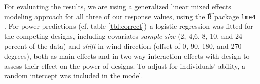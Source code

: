 

For evaluating the results, we are using a generalized linear mixed effects modeling  approach \cite{pinheiro:2000} for all three of our response values, using the {\t R} package {\tt lme4} \cite{bates:2011}. 
For power predictions (cf. table \ref{tbl:correct}) a logistic regression was fitted for the competing designs, including covariates {\it sample size} (2, 4,6, 8, 10, and 24 percent of the data) and {\it shift} in wind direction (offset of 0, 90, 180, and 270 degrees), both as main effects and in two-way interaction effects with design to assess their effect on the power of designs. To adjust for individuals' ability, a random intercept was included in the model.

